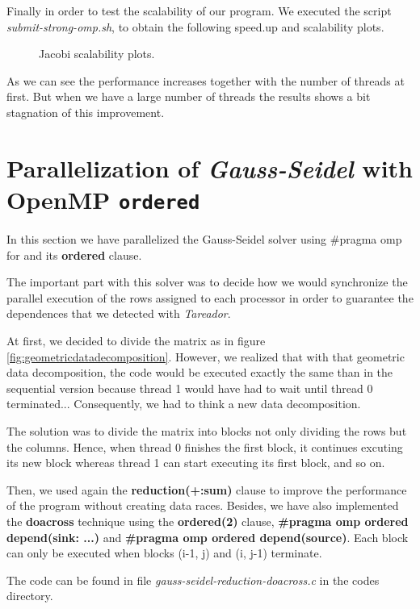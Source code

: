 \documentclass[12pt, a4paper]{article}
\begin{document}
Finally in order to test the scalability of our program. We executed the script \textit{submit-strong-omp.sh}, to obtain the following speed.up and scalability plots.

\begin{figure}[H]
	\centering
	\caption{Jacobi scalability plots.}
\end{figure}

As we can see the performance increases together with the number of threads at first. But when we have a large number of threads the results shows a bit stagnation of this improvement.

\section{Parallelization of \textit{Gauss-Seidel} with OpenMP \texttt{ordered}}

In this section we have parallelized the Gauss-Seidel solver using \#pragma omp for and its \textbf{ordered} clause.

The important part with this solver was to decide how we would synchronize the parallel execution of the rows assigned to each processor in order to guarantee the dependences that we detected with \textit{Tareador}.

At first, we decided to divide the matrix as in figure \ref{fig:geometricdatadecomposition}. However, we realized that with that geometric data decomposition, the code would be executed exactly the same than in the sequential version because thread 1 would have had to wait until thread 0 terminated... Consequently, we had to think a new data decomposition.

The solution was to divide the matrix into blocks not only dividing the rows but the columns. Hence, when thread 0 finishes the first block, it continues excuting its new block whereas thread 1 can start executing its first block, and so on.

Then, we used again the \textbf{reduction(+:sum)} clause to improve the performance of the program without creating data races. Besides, we have also implemented the \textbf{doacross} technique using the \textbf{ordered(2)} clause, \textbf{\#pragma omp ordered depend(sink: ...)} and \textbf{\#pragma omp ordered depend(source)}. Each block can only be executed when blocks (i-1, j) and (i, j-1) terminate.

The code can be found in file \textit{gauss-seidel-reduction-doacross.c} in the codes directory.
\end{document}
